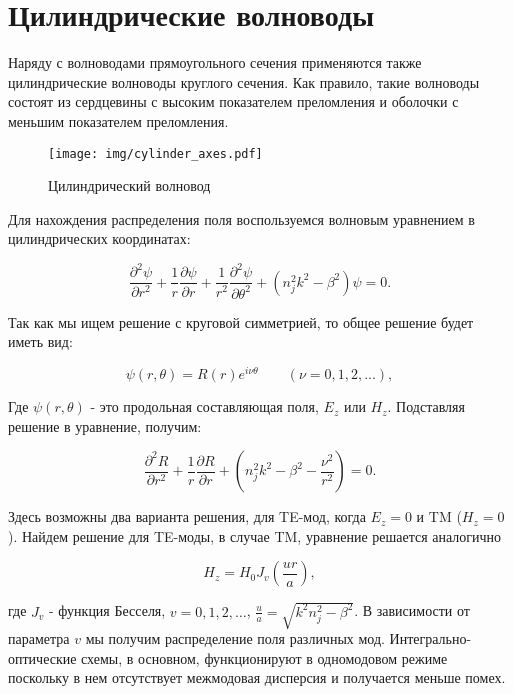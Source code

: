 \section{Цилиндрические волноводы}
\label{cylinder_waveguides}
Наряду с волноводами прямоугольного сечения применяются также цилиндрические волноводы круглого сечения. Как правило, такие волноводы состоят из сердцевины с высоким показателем преломления и оболочки с меньшим показателем преломления. 

\begin{figure}[h!]
	\texttt{[image: img/cylinder\_axes.pdf]}
	\caption{Цилиндрический волновод}
\end{figure}

Для нахождения распределения поля воспользуемся волновым уравнением в цилиндрических координатах:

\begin{equation}
	\frac{\partial^2\psi}{\partial r^2} + \frac{1}{r}\frac{\partial\psi}{\partial r}+\frac{1}{r^2}\frac{\partial^2\psi}{\partial\theta^2}+(n_j^2 k^2 - \beta^2)\psi = 0.
\end{equation}

Так как мы ищем решение с круговой симметрией, то общее решение будет иметь вид:

\begin{equation}
	\psi(r, \theta) = R(r)e^{i\nu\theta} \qquad (\nu = 0,1,2, ...),
\end{equation}

Где $\psi(r, \theta)$ - это продольная составляющая поля, $E_z$ или $H_z$. Подставляя решение в уравнение, получим:

\begin{equation}
	\frac{\partial^2 R}{\partial r^2} + \frac{1}{r}\frac{\partial R}{\partial r}+(n_j^2 k^2 - \beta^2 - \frac{\nu^2}{r^2}) = 0.
\end{equation}

Здесь возможны два варианта решения, для TE-мод, когда $E_z = 0$ и TM ($H_z = 0$). Найдем решение для TE-моды, в случае TM, уравнение решается аналогично

\begin{equation}
	H_z = H_0 J_v (\frac{ur}{a}),
	\label{cylinder_bessel}
\end{equation}

где $J_v$ - функция Бесселя, $v = 0, 1, 2,\ldots$, $\frac{u}{a} = \sqrt{k^2 n_j^2 - \beta^2}$. В зависимости от параметра $v$ мы получим распределение поля различных мод. Интегрально-оптические схемы, в основном, функционируют в одномодовом режиме поскольку в нем отсутствует межмодовая дисперсия и получается меньше помех.